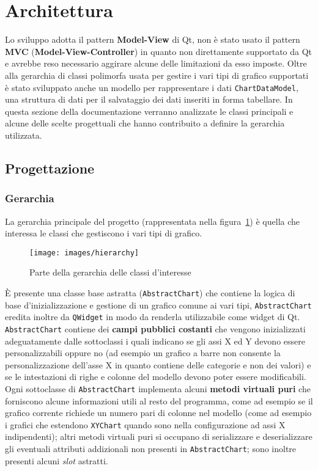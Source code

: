 \section{Architettura}
Lo sviluppo adotta il pattern \textbf{Model-View} di Qt, non è stato usato il pattern \textbf{MVC}
(\textbf{Model-View-Controller}) in quanto non direttamente supportato da Qt e avrebbe reso necessario aggirare alcune
delle limitazioni da esso imposte.
Oltre alla gerarchia di classi polimorfa usata per gestire i vari tipi di grafico supportati è stato sviluppato anche un
modello per rappresentare i dati \texttt{ChartDataModel}, una struttura di dati per il salvataggio dei dati inseriti in
forma tabellare.
In questa sezione della documentazione verranno analizzate le classi principali e alcune delle scelte progettuali che
hanno contribuito a definire la gerarchia utilizzata.

\subsection{Progettazione}

\subsubsection{Gerarchia}
La gerarchia principale del progetto (rappresentata nella figura~\ref{fig:hierarchy}) è quella che interessa le classi
che gestiscono i vari tipi di grafico.\\
\begin{figure}[H]
    \centering
    \label{fig:hierarchy}
    \texttt{[image: images/hierarchy]}
    \caption{Parte della gerarchia delle classi d'interesse}
\end{figure} \noindent
È presente una classe base astratta (\texttt{AbstractChart}) che contiene la logica di base d'inizializzazione e
gestione di un grafico comune ai vari tipi, \texttt{AbstractChart} eredita inoltre da \texttt{QWidget} in modo da
renderla utilizzabile come widget di Qt.\\
\texttt{AbstractChart} contiene dei \textbf{campi pubblici costanti} che vengono inizializzati adeguatamente dalle
sottoclassi i quali indicano se gli assi X ed Y devono essere personalizzabili oppure no (ad esempio un grafico a barre
non consente la personalizzazione dell'asse X in quanto contiene delle categorie e non dei valori) e se le
intestazioni di righe e colonne del modello devono poter essere modificabili.\\
Ogni sottoclasse di \texttt{AbstractChart} implementa alcuni \textbf{metodi virtuali puri} che forniscono alcune
informazioni utili al resto del programma, come ad esempio se il grafico corrente richiede un numero pari di colonne nel
modello (come ad esempio i grafici che estendono \texttt{XYChart} quando sono nella configurazione ad assi X
indipendenti); altri metodi virtuali puri si occupano di serializzare e deserializzare gli eventuali attributi
addizionali non presenti in \texttt{AbstractChart}; sono inoltre presenti alcuni \textit{slot} astratti.

